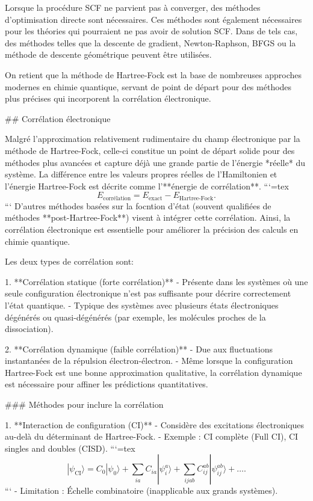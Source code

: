 \documentclass[12pt,a4paper]{report}
\begin{document}
\begin{markdown}
Lorsque la procédure SCF ne parvient pas à converger, des méthodes d'optimisation directe sont nécessaires. Ces
méthodes sont également nécessaires pour les théories qui pourraient ne pas avoir de solution SCF. Dans de tels cas, des
méthodes telles que la descente de gradient, Newton-Raphson, BFGS ou la méthode de descente géométrique peuvent être utilisées.

On retient que la méthode de Hartree-Fock est la base de nombreuses approches modernes en chimie quantique, servant de point de départ pour des méthodes plus précises qui incorporent la corrélation électronique.

## Corrélation électronique

Malgré l'approximation relativement rudimentaire du champ électronique par la méthode de Hartree-Fock, celle-ci constitue un point de départ solide pour des méthodes plus avancées et capture déjà une grande partie de l’énergie *réelle* du système. La différence entre les valeurs propres réelles de l’Hamiltonien et l’énergie Hartree-Fock est décrite comme l’**énergie de corrélation**.
```{=tex}
\begin{equation}
E_{\text{corrélation}} = E_{\text{exact}} - E_{\text{Hartree-Fock}}.
\end{equation}
```
 D'autres méthodes basées sur la focntion d'état (souvent qualifiées de méthodes **post-Hartree-Fock**) visent à intégrer cette corrélation. Ainsi, la corrélation électronique est essentielle pour améliorer la précision des calculs en chimie quantique.
 
 Les deux types de corrélation sont:

1. **Corrélation statique (forte corrélation)**
   - Présente dans les systèmes où une seule configuration électronique n’est pas suffisante pour décrire correctement l’état quantique.
   - Typique des systèmes avec plusieurs états électroniques dégénérés ou quasi-dégénérés (par exemple, les molécules proches de la dissociation).

2. **Corrélation dynamique (faible corrélation)**
   - Due aux fluctuations instantanées de la répulsion électron-électron.
   - Même lorsque la configuration Hartree-Fock est une bonne approximation qualitative, la corrélation dynamique est nécessaire pour affiner les prédictions quantitatives.

### Méthodes pour inclure la corrélation

1. **Interaction de configuration (CI)**
   - Considère des excitations électroniques au-delà du déterminant de Hartree-Fock.
   - Exemple : CI complète (Full CI), CI singles and doubles (CISD).
```{=tex}
\begin{equation}
|\psi_{\text{CI}}\rangle = C_0 |\psi_0\rangle + \sum_{ia} C_{ia} |\psi_i^a\rangle + \sum_{ijab} C_{ij}^{ab} |\psi_{ij}^{ab}\rangle + \dots .
\end{equation}
```
   - Limitation : Échelle combinatoire (inapplicable aux grands systèmes).


\end{markdown}
\end{document}
